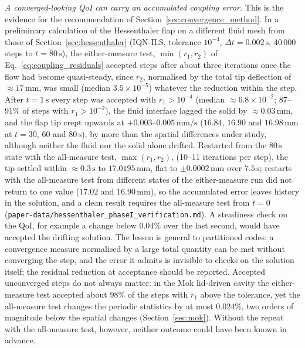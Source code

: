 \emph{A converged-looking QoI can carry an accumulated coupling error.}
This is the evidence for the recommendation of Section~\ref{sec:convergence_method}.
In a preliminary calculation of the Hessenthaler flap on a different fluid mesh from those of Section~\ref{sec:hessenthaler} (IQN-ILS, tolerance $10^{-4}$, $\Delta t = 0.002\,\mathrm{s}$, 40\,000 steps to $t = 80\,\mathrm{s}$), the either-measure test, $\min(r_1, r_2)$ of Eq.~\eqref{eq:coupling_residuals} accepted steps after about three iterations once the flow had become quasi-steady, since $r_2$, normalised by the total tip deflection of $\approx17\,\mathrm{mm}$, was small (median $3.5\times10^{-5}$) whatever the reduction within the step.
After $t = 1\,\mathrm{s}$ every step was accepted with $r_1 > 10^{-4}$ (median $\approx6.8\times10^{-2}$; $87$--$91\%$ of steps with $r_1 > 10^{-2}$), the fluid interface lagged the solid by $\approx0.03\,\mathrm{mm}$, and the flap tip crept upwards at $+0.003$--$0.005\,\mathrm{mm/s}$ ($16.84$, $16.90$ and $16.98\,\mathrm{mm}$ at $t = 30$, $60$ and $80\,\mathrm{s}$), by more than the spatial differences under study, although neither the fluid nor the solid alone drifted.
Restarted from the $80\,\mathrm{s}$ state with the all-measure test, $\max(r_1, r_2)$, (10--11 iterations per step), the tip settled within $\approx0.3\,\mathrm{s}$ to $17.0195\,\mathrm{mm}$, flat to $\pm0.0002\,\mathrm{mm}$ over $7.5\,\mathrm{s}$; restarts with the all-measure test from different states of the either-measure run did not return to one value ($17.02$ and $16.90\,\mathrm{mm}$), so the accumulated error leaves history in the solution, and a clean result requires the all-measure test from $t = 0$ (\texttt{paper-data/hessenthaler\_phaseI\_verification.md}).
A steadiness check on the QoI, for example a change below $0.04\%$ over the last second, would have accepted the drifting solution.
The lesson is general to partitioned codes: a convergence measure normalised by a large total quantity can be met without converging the step, and the error it admits is invisible to checks on the solution itself; the residual reduction at acceptance should be reported.
Accepted unconverged steps do not always matter: in the Mok lid-driven cavity the either-measure test accepted about $98\%$ of the steps with $r_1$ above the tolerance, yet the all-measure test changes the periodic statistics by at most $0.024\%$, two orders of magnitude below the spatial changes (Section~\ref{sec:mok}). Without the repeat with the all-measure test, however, neither outcome could have been known in advance.

